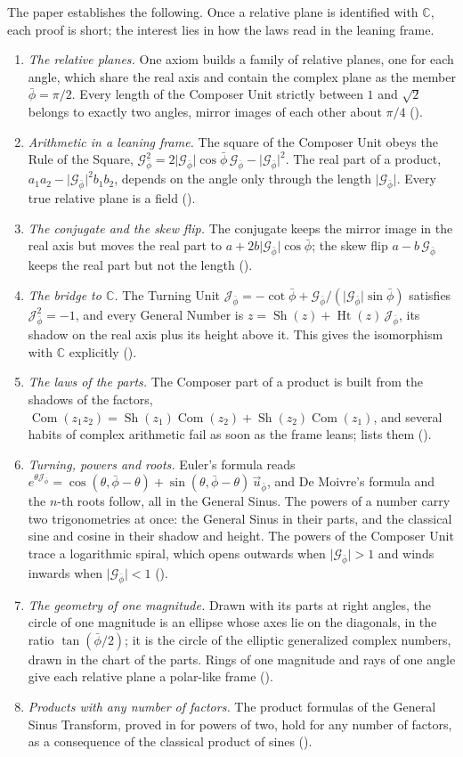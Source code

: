 \documentclass[11pt,a4paper]{amsart}
\theoremstyle{plain}
\theoremstyle{definition}
\theoremstyle{remark}
\newcommand{\pb}{\bar{\phi}}                     %
\newcommand{\Gp}{\mathcal{G}_{\bar{\phi}}}       %
\newcommand{\up}{\vec{u}_{\bar{\phi}}}           %
\newcommand{\Jp}{\mathcal{J}_{\bar{\phi}}}       %
\newcommand{\C}{\mathbb{C}}
\DeclareMathOperator{\Com}{Com}                  %
\DeclareMathOperator{\Sh}{Sh}                    %
\DeclareMathOperator{\Ht}{Ht}                    %
\begin{document}
The paper establishes the following. Once a relative plane is identified with $\C$, each proof is short; the interest lies in how the laws read in the leaning frame.
\begin{enumerate}
  \item \emph{The relative planes.} One axiom builds a family of relative planes, one for each angle, which share the real axis and contain the complex plane as the member $\pb = \pi/2$. Every length of the Composer Unit strictly between $1$ and $\sqrt{2}$ belongs to exactly two angles, mirror images of each other about $\pi/4$ ().
  \item \emph{Arithmetic in a leaning frame.} The square of the Composer Unit obeys the Rule of the Square, $\Gp^2 = 2\lvert\Gp\rvert\cos\pb\,\Gp - \lvert\Gp\rvert^2$. The real part of a product, $a_1a_2 - \lvert\Gp\rvert^2 b_1b_2$, depends on the angle only through the length $\lvert\Gp\rvert$. Every true relative plane is a field ().
  \item \emph{The conjugate and the skew flip.} The conjugate keeps the mirror image in the real axis but moves the real part to $a + 2b\lvert\Gp\rvert\cos\pb$; the skew flip $a - b\,\Gp$ keeps the real part but not the length ().
  \item \emph{The bridge to $\C$.} The Turning Unit $\Jp = -\cot\pb + \Gp/(\lvert\Gp\rvert\sin\pb)$ satisfies $\Jp^2 = -1$, and every General Number is $z = \Sh(z) + \Ht(z)\,\Jp$, its shadow on the real axis plus its height above it. This gives the isomorphism with $\C$ explicitly ().
  \item \emph{The laws of the parts.} The Composer part of a product is built from the shadows of the factors, $\Com(z_1z_2) = \Sh(z_1)\Com(z_2) + \Sh(z_2)\Com(z_1)$, and several habits of complex arithmetic fail as soon as the frame leans;  lists them ().
  \item \emph{Turning, powers and roots.} Euler's formula reads $e^{\theta\Jp} = \cos(\theta, \pb - \theta) + \sin(\theta, \pb - \theta)\,\up$, and De Moivre's formula and the $n$-th roots follow, all in the General Sinus. The powers of a number carry two trigonometries at once: the General Sinus in their parts, and the classical sine and cosine in their shadow and height. The powers of the Composer Unit trace a logarithmic spiral, which opens outwards when $\lvert\Gp\rvert > 1$ and winds inwards when $\lvert\Gp\rvert < 1$ ().
  \item \emph{The geometry of one magnitude.} Drawn with its parts at right angles, the circle of one magnitude is an ellipse whose axes lie on the diagonals, in the ratio $\tan(\pb/2)$; it is the circle of the elliptic generalized complex numbers, drawn in the chart of the parts. Rings of one magnitude and rays of one angle give each relative plane a polar-like frame ().
  \item \emph{Products with any number of factors.} The product formulas of the General Sinus Transform, proved in \citep{Derraz2026GSP} for powers of two, hold for any number of factors, as a consequence of the classical product of sines ().
\end{enumerate}
\end{document}

